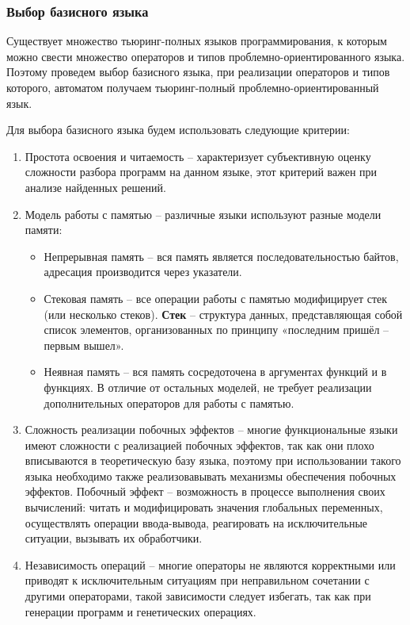 \documentclass[russian,utf8,emptystyle]{eskdtext}
\begin{document}
\begin{spacing}{1.5}
\subsubsection{Выбор базисного языка}
Существует множество тьюринг-полных языков программирования, к которым можно свести множество операторов и типов проблемно-ориентированного языка. Поэтому проведем выбор базисного языка, при реализации операторов и типов которого, автоматом получаем тьюринг-полный проблемно-ориентированный язык.

Для выбора базисного языка будем использовать следующие критерии:
\begin{enumerate}
\item Простота освоения и читаемость -- характеризует субъективную оценку сложности разбора программ на данном языке, этот критерий важен при анализе найденных решений.
\item Модель работы с памятью -- различные языки используют разные модели памяти:
\begin{itemize}
\item Непрерывная память -- вся память является последовательностью байтов, адресация производится через указатели.
\item Стековая память -- все операции работы с памятью модифицирует стек (или несколько стеков). \textbf{Стек} -- структура данных, представляющая собой список элементов, организованных по принципу «последним пришёл -- первым вышел».
\item Неявная память -- вся память сосредоточена в аргументах функций и в функциях. В отличие от остальных моделей, не требует реализации дополнительных операторов для работы с памятью.
\end{itemize}

\item Сложность реализации побочных эффектов -- многие функциональные языки имеют сложности с реализацией побочных эффектов, так как они плохо вписываются в теоретическую базу языка, поэтому при использовании такого языка необходимо также реализовавывать механизмы обеспечения побочных эффектов. Побочный эффект -- возможность в процессе выполнения своих вычислений: читать и модифицировать значения глобальных переменных, осуществлять операции ввода-вывода, реагировать на исключительные ситуации, вызывать их обработчики.

\item Независимость операций -- многие операторы не являются корректными или приводят к исключительным ситуациям при неправильном сочетании с другими операторами, такой зависимости следует избегать, так как при генерации программ и генетических операциях.


\end{enumerate}
\end{spacing}
\end{document}

